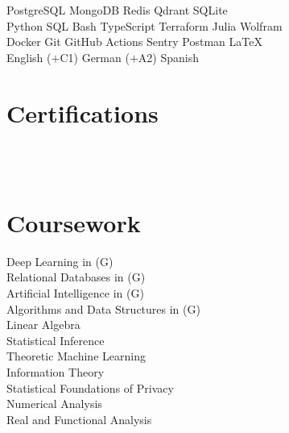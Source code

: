 \documentclass{tex/deedy-resume-openfont}
\begin{document}
\begin{minipage}[t]{0.32\textwidth}
PostgreSQL \textbullet{} 
MongoDB \textbullet{} 
Redis \textbullet{} 
Qdrant \textbullet{} 
SQLite \\[4pt]

Python \textbullet{} 
SQL \textbullet{} 
Bash \textbullet{} 
TypeScript \textbullet{} 
Terraform \textbullet{} 
Julia \textbullet{} 
Wolfram \\[4pt]

Docker \textbullet{} 
Git \textbullet{} 
GitHub Actions \textbullet{} 
Sentry \textbullet{} 
Postman \textbullet{} 
\LaTeX{}\\[4pt]

English ($+$C1) \textbullet{} German ($+$A2) \textbullet{} Spanish\\[4pt]


\section{Certifications}
\href{https://www.credly.com/users/danivpv}{}\\
\href{https://www.credly.com/users/danivpv}{}\\[4pt]


\section{Coursework}
Deep Learning in (G)\\
Relational Databases in  (G)\\
Artificial Intelligence in  (G)\\
Algorithms and Data Structures in  (G)\\
Linear Algebra\\[4pt]

Statistical Inference\\
Theoretic Machine Learning\\
Information Theory\\
Statistical Foundations of Privacy\\
Numerical Analysis \\
Real and Functional Analysis


%
%

\end{minipage} 
\end{document}
